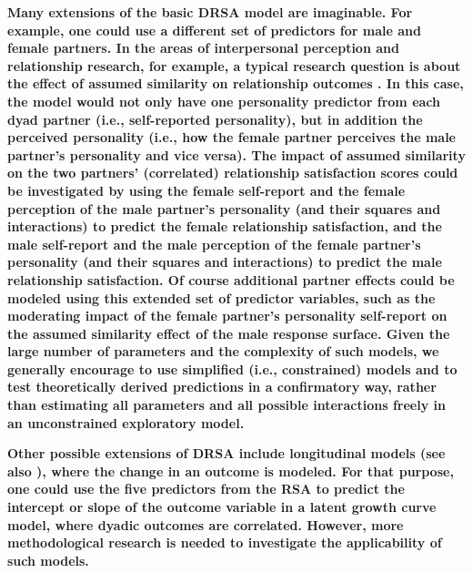 \documentclass[jou,a4paper,draftfirst]{apa6}
\newcommand{\added}[1]{\textcolor{colour_added}{\bf{#1}}}
\begin{document}
\added{Many extensions of the basic DRSA model are imaginable. For example, one could use a different set of predictors for male and female partners. In the areas of interpersonal perception and relationship research, for example, a typical research question is about the effect of assumed similarity on relationship outcomes \parencite{Back_Vazire_2015}. In this case, the model would not only have one personality predictor from each dyad partner (i.e., self-reported personality), but in addition the perceived personality (i.e., how the female partner perceives the male partner's personality and vice versa). The impact of assumed similarity on the two partners' (correlated) relationship satisfaction scores could be investigated by using the female self-report and the female perception of the male partner's personality (and their squares and interactions) to predict the female relationship satisfaction, and the male self-report and the male perception of the female partner's personality (and their squares and interactions) to predict the male relationship satisfaction. Of course additional partner effects could be modeled using this extended set of predictor variables, such as the moderating impact of the female partner's personality self-report on the assumed similarity effect of the male response surface. Given the large number of parameters and the complexity of such models, we generally encourage to use simplified (i.e., constrained) models and to test theoretically derived predictions in a confirmatory way, rather than estimating all parameters and all possible interactions freely in an unconstrained exploratory model.}

\added{Other possible extensions of DRSA include longitudinal models (see also \nptextcite{NestlerEtAl2015}), where the change in an outcome is modeled. For that purpose, one could use the five predictors from the RSA to predict the intercept or slope of the outcome variable in a latent growth curve model, where dyadic outcomes are correlated. However, more methodological research is needed to investigate the applicability of such models.}
\end{document}
